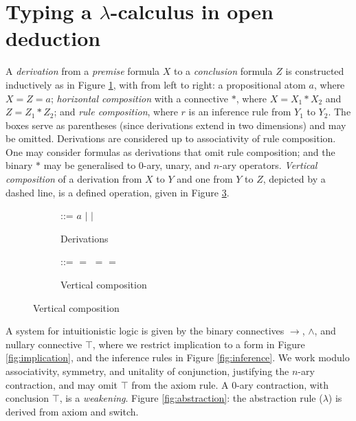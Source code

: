\documentclass[a4paper,UKenglish,cleveref, autoref]{lipics-v2019}
\begin{document}
\section{Typing a $\lambda$-calculus in open deduction}
\label{sec:typingacalculus}

A \emph{derivation} from a \emph{premise} formula $X$ to a \emph{conclusion} formula $Z$ is constructed inductively as in Figure \ref{fig:derivations}, with from left to right: a propositional atom $a$, where $X = Z = a$; \emph{horizontal composition} with a connective $*$, where $X = X_{1} * X_{2}$ and $Z = Z_{1} * Z_{2}$; and \emph{rule composition}, where $r$ is an inference rule from $Y_{1}$ to $Y_{2}$. The boxes serve as parentheses (since derivations extend in two dimensions) and may be omitted. Derivations are considered up to associativity of rule composition. One may consider formulas as derivations that omit rule composition; and the binary $*$ may be generalised to $0$-ary, unary, and $n$-ary operators. \emph{Vertical composition} of a derivation from $X$ to $Y$ and one from $Y$ to $Z$, depicted by a dashed line, is a defined operation, given in Figure \ref{fig:vertical}. 

\begin{figure}[h]
	\centering
	\begin{subfigure}[b]{0.3\textwidth}
{ \small
{} {:}{:}{=} $a$ $\vert$  $\vert$ 
}
	\caption{Derivations}
	\label{fig:derivations}
	\end{subfigure}
	\hfill
	\begin{subfigure}[b]{0.6\textwidth}
{ \small
{} {:}{:}{=}  $=$  $=$ 
} \hfill
{\small
{} 
=
}
	\caption{Vertical composition}
	\label{fig:vertical}
	\end{subfigure}
\end{figure}

\noindent A system for intuitionistic logic is given by the binary connectives $\rightarrow$, $\wedge$, and nullary connective $\top$, where we restrict implication to a form in Figure \ref{fig:implication}, and the inference rules in Figure \ref{fig:inference}. We work modulo associativity, symmetry, and unitality of conjunction, justifying the $n$-ary contraction, and may omit $\top$ from the axiom rule. A $0$-ary contraction, with conclusion $\top$, is a \emph{weakening}. Figure \ref{fig:abstraction}: the abstraction rule ($\lambda$) is derived from axiom and switch.
\end{document}
